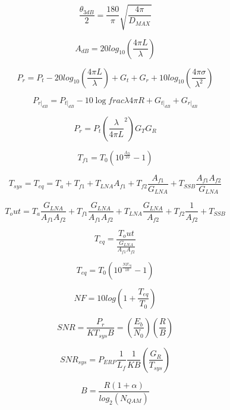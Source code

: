 \begin{equation}
	\frac{\theta_{3dB}}{2}= \frac{180}{\pi}\sqrt{\frac{4\pi}{D_{MAX}}}
\end{equation}

\begin{equation}
	A_{dB} = 20log_{10} \left( \frac{4 \pi L}{\lambda} \right)
\end{equation}

\begin{equation}
	P_r= P_t - 20log_{10}\left( \frac{4\pi L}{\lambda}\right)+ G_t +G_r + 10log_{10}\left( \frac{4 \pi \sigma}{\lambda^2}\right)
\end{equation}

\begin{equation}	
P_{r|_{dB}} = P_{t|_{dB}} - 10 \log{frac{\lambda}{4\pi R}} + G_{t|_{dB}} + G_{r|_{dB}} 
\end{equation}

\begin{equation}
P_r = P_t  \left( \frac { \lambda } {4 \pi L}^2 \right) G_T G_R
\end{equation}

\begin{equation}
	T_{f1} = T_0 (10^{ \frac {A_{f1}} {10} }-1)
\end{equation}

\begin{equation}
	T_{sys}=T_{eq}= T_a + T_{f1} + T_{LNA} A_{f1}+ T_{f2} \frac { A_{f1} } {G_{LNA}} + T_{SSB} \frac { A_{f1} A_{f2} } {G_{LNA}}
\end{equation}

\begin{equation}
	T_out = T_a\frac {G_{LNA}} {A_{f1} A_{f2} } + T_{f1}\frac { G_{LNA}} {A_{f1}A_{f2}} + T_{LNA}\frac{G_{LNA}}{A_{f2}}+ T_{f2}\frac{1}{A_{f2}} + T_{SSB} 
\end{equation}

\begin{equation}
	T_{eq}=\frac{T_out}{\frac{G_{LNA}}{A_{f1}A_{f2}}}
\end{equation}

\begin{equation}
	T_{eq}= T_0(10^{\frac{NF_{eq}}{10}}-1)
\end{equation}

\begin{equation}
	NF = 10log\left(1+\frac{T_{eq}}{T_0}\right)
\end{equation}

\begin{equation}	
SNR = \frac{P_r}{KT_{sys}B}=\left(\frac{E_b}{N_0}\right)\left(\frac{R}{B}\right)
\end{equation}

\begin{equation}
	SNR_{sys}= P_{ERP}\frac{1}{L_f}\frac{1}{KB}\left( \frac{G_R}{T_{sys}}\right)
\end{equation}

\begin{equation}
	B= \frac {R(1+ \alpha)} {log_2(N_{QAM})}
\end{equation}
